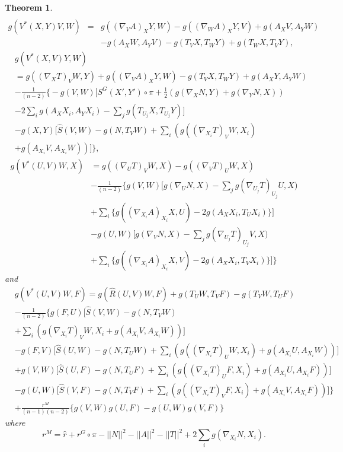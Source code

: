 \documentclass{birkjour}
\newtheorem{theorem}{Theorem}[section]
\theoremstyle{definition}
\theoremstyle{remark}
\numberwithin{equation}{section}
\begin{document}
\begin{theorem}
\begin{align*}
	\end{align*}
	\begin{align*}
		g(V^* (X,Y)V, W)&=& g((\nabla_V A)_X Y, W)- g((\nabla_W A)_X Y, V)+ g(A_X V, A_Y W)\\
		&& - g(A_X W, A_Y V) - g(T_V X, T_W Y) + g(T_W X, T_V Y),
	\end{align*}
	\begin{align*}
		&g(V^* (X,V)Y ,W)\\
		&=g((\nabla_X T)_V W, Y) + g((\nabla_V A)_X Y,W)- g(T_V X, T_W Y) + g(A_X Y, A_Y W)\\
		&-\frac{1}{(n-2)} \bigg\{ - g(V,W) \Big[ S^G (X', Y') \circ \pi + \frac{1}{2} \left(g(\nabla_X N,Y)+ g(\nabla_Y N,X)\right) \\
		&- 2 \sum_{i} g(A_X X_i, A_Y X_i) -\sum_{j} g(T_{U_j}X, T_{U_j}Y) \Big]\\
		& - g(X,Y) \Big[\hat{S} (V,W) -g(N,T_V W) + \sum_{i}\left(g((\nabla_{X_i}T)_V W,X_i) \right.\\
		& \left. + g(A_{X_i} V, A_{X_i}W)  \right) \Big] \bigg\},
	\end{align*}
	\begin{align*}
		g(V^* (U,V)W ,X)&= g((\nabla_U T)_V W, X) - g((\nabla_V T)_U W, X)\\
		&- \frac{1}{(n-2)} \bigg\{g(V,W) \Big[g(\nabla_U N,X) -\sum_{j} g(\nabla_{U_j}T)_{U_j}U,X)  \\
		&+ \sum_{i} \{g((\nabla_{X_i}A)_{X_i} X,U)-2g(A_X {X_i}, T_U X_i)\}\Big] \\
		&- g(U,W)  \Big[g(\nabla_V N,X) -\sum_{j} g(\nabla_{U_j}T)_{U_j}V,X)  \\
		&+ \sum_{i} \{g((\nabla_{X_i}A)_{X_i} X,V)-2g(A_X {X_i}, T_V X_i)\}\Big] \bigg\}
	\end{align*}
	and
	\begin{align*}
		&g(V^* (U,V)W ,F)=g(\hat{R} (U,V)W, F) + g(T_U W, T_V F) - g(T_V W, T_U F ) \\
		&- \frac{1}{(n-2)} \bigg\{ g(F,U) \Big[ \hat{S}(V,W)- g(N, T_V W) \\
		& + \sum_{i}\left(g(\nabla_{X_i}T)_V W, {X_i}+ g(A_{X_i}V, A_{X_i}W)\right)  \Big] \\
		&-g(F,V) \Big[ \hat{S}(U,W) -g(N,T_U W)+ \sum_{i} \left(g((\nabla_{X_i}T)_U W, X_i)+ g(A_{X_i}U, A_{X_i}W) \right)\Big]\\
		&+g(V,W) \Big[\hat{S}(U,F) -g(N, T_U F)+ \sum_{i}\left(g((\nabla_{X_i}T)_U F, X_i)+g(A_{X_i}U,A_{X_i}F)\right)\Big]\\
		&-g(U,W) \Big[\hat{S}(V,F)-g(N,T_V F) + \sum_{i}\left(g((\nabla_{X_i}T)_V F, X_i)+ g(A_{X_i} V, A_{X_i}F)\right)\Big] \bigg\}\\
		&+\frac{r^M}{(n-1)(n-2)} \{g(V,W)g(U,F)-g(U,W)g(V,F)\}
	\end{align*}
	where
	\begin{equation*}
	r^M= \hat{r}+r^G \circ \pi - ||N||^2-||A||^2- ||T||^2+ 2 \sum_{i} g(\nabla_{X_i} N, X_i).
	\end{equation*}
\end{theorem}
\end{document}
